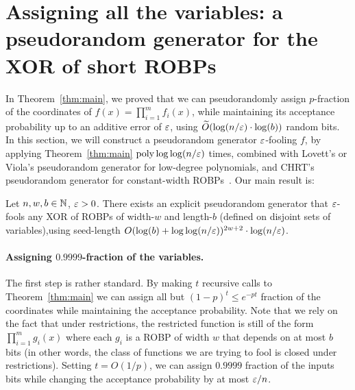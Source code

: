 \newcommand{\VBad}{\mathsf{VarBad}}
\newcommand{\V}{\mathsf{Var}}
\newcommand{\Bad}{\mathsf{Bad}}
\newcommand{\Good}{\mathsf{Good}}


\newcommand{\GMany}{\mathbf{G_{\oplus Many}}}
\newcommand{\GXOR}{\mathbf{GXOR}}




\section{Assigning all the variables: a pseudorandom generator for the XOR of short ROBPs}\label{sec:assign_all}

In Theorem~\ref{thm:main}, we proved that we can pseudorandomly assign $p$-fraction of the coordinates of $f(x) = \prod_{i=1}^{m}{f_i(x)}$, while maintaining its acceptance probability up to an additive error  of $\varepsilon$, using $\widetilde{O}(\log(n/\varepsilon)\cdot \log(b))$ random bits.
In this section, we will construct a pseudorandom generator $\varepsilon$-fooling $f$, by applying Theorem~\ref{thm:main} ${\mathrm{poly}}\log\log(n/\varepsilon)$ times, combined with Lovett's \cite{Lovett08} or Viola's \cite{Viola08} pseudorandom generator for low-degree polynomials, and CHRT's pseudorandom generator for constant-width ROBPs~\cite{CHRT17}. Our main result is:
\begin{thm}\label{thm:GXOR}
Let $n,w,b\in {\mathbb{N}}$, $\varepsilon>0$. There exists an explicit pseudorandom generator that $\varepsilon$-fools any XOR of ROBPs of  width-$w$ and length-$b$ (defined on disjoint sets of variables),using seed-length $O(\log(b) + \log\log(n/\varepsilon))^{2w+2} \cdot \log(n/\varepsilon)$.
\end{thm}

\paragraph{Assigning $0.9999$-fraction of the variables.}
The first step is rather standard. 
By making $t$ recursive calls to Theorem~\ref{thm:main} we can assign all but $(1-p)^t \le e^{-pt}$ fraction of the coordinates while maintaining the acceptance probability.
Note that we rely on the fact that under restrictions, the restricted function is still of the form $\prod_{i=1}^{m}{g_i(x)}$ where each $g_i$ is a ROBP of width $w$ that depends on at most $b$ bits (in other words, the class of functions we are trying to fool is closed under restrictions).
Setting $t = O(1/p)$, we can assign $0.9999$ fraction of the inputs bits while changing the acceptance probability by at most $\varepsilon/n$.

